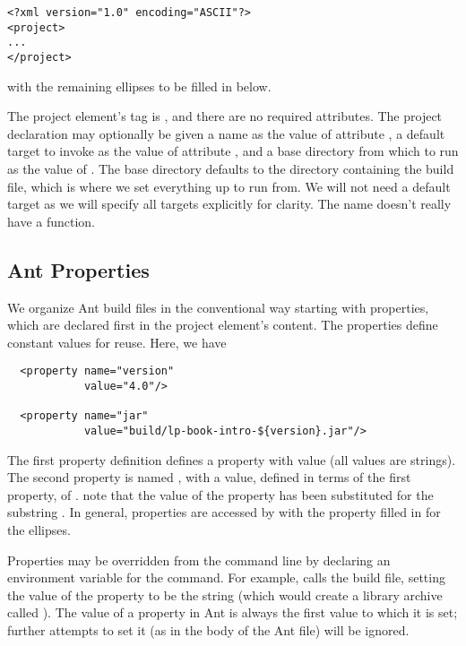 \begin{verbatim}
<?xml version="1.0" encoding="ASCII"?>
<project>
...
</project>
\end{verbatim}
%
with the remaining ellipses to be filled in below.

The project element's tag is , and there are no required
attributes.  The project declaration may optionally be given a name as
the value of attribute , a default target to invoke as the
value of attribute , and a base directory from which to
run as the value of .  The base directory defaults
to the directory containing the build file, which is where we set
everything up to run from.  We will not need a default target as we
will specify all targets explicitly for clarity.  The name doesn't
really have a function.

\subsection{Ant Properties}\label{section:intro-ant-properties}

We organize Ant build files in the conventional way starting with
properties, which are declared first in the project element's content.
The properties define constant values for reuse.  Here, we have
%
\begin{verbatim}
  <property name="version"
            value="4.0"/>

  <property name="jar"
            value="build/lp-book-intro-${version}.jar"/>
\end{verbatim}
%
The first property definition defines a property  with
value  (all values are strings).  The second property is
named , with a value, defined in terms of the first property,
of .  note that the value of the
property  has been substituted for the substring .
In general, properties are accessed by
 with the property filled in for the ellipses.

Properties may be overridden from the command line by declaring
an environment variable for the command.  For example,
%
%
calls the build file, setting the value of the 
property to be the string  (which would create a library
archive called ).  The value of a property in Ant is
always the first value to which it is set; further attempts to set it
(as in the body of the Ant file) will be ignored.


